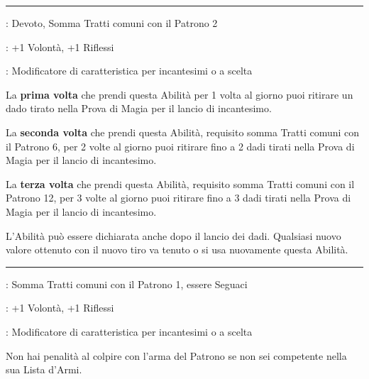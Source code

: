 \begin{multicols}{2}
\smallskip\noindent\rule{\linewidth}{2pt} \hypertarget{Il Patrono è con me}{}\medskip{}
\noindent
\begin{description}[noitemsep, topsep=0pt, parsep=0pt, partopsep=0pt, leftmargin=0cm, labelwidth=2.5cm]
    \item[\textbf{Requisito}]: Devoto, Somma Tratti comuni con il Patrono 2
    \item[\textbf{Tiri Salvezza}]: +1 Volontà, +1 Riflessi
    \item[\textbf{Caratteristica}]: Modificatore di caratteristica per incantesimi o a scelta
\end{description}

La \textbf{prima volta} che prendi questa Abilità per 1 volta al giorno puoi ritirare un dado tirato nella Prova di Magia per il lancio di incantesimo.

La \textbf{seconda volta} che prendi questa Abilità, requisito somma Tratti comuni con il Patrono 6, per 2 volte al giorno puoi ritirare fino a 2 dadi tirati nella Prova di Magia per il lancio di incantesimo.

La \textbf{terza volta} che prendi questa Abilità, requisito somma Tratti comuni con il Patrono 12, per 3 volte al giorno puoi ritirare fino a 3 dadi tirati nella Prova di Magia per il lancio di incantesimo.

L'Abilità può essere dichiarata anche dopo il lancio dei dadi. Qualsiasi nuovo valore ottenuto con il nuovo tiro va tenuto o si usa nuovamente questa Abilità.

\smallskip\noindent\rule{\linewidth}{2pt} \hypertarget{Il Patrono è la mia Arma}{}\medskip{}\label{Il Patrono è la mia Arma}
\noindent
\begin{description}[noitemsep, topsep=0pt, parsep=0pt, partopsep=0pt, leftmargin=0cm, labelwidth=2.5cm]
    \item[\textbf{Requisito}]: Somma Tratti comuni con il Patrono 1, essere Seguaci
    \item[\textbf{Tiri Salvezza}]: +1 Volontà, +1 Riflessi
    \item[\textbf{Caratteristica}]: Modificatore di caratteristica per incantesimi o a scelta
\end{description}

Non hai penalità al colpire con l'arma del Patrono se non sei competente nella sua Lista d'Armi.


\end{multicols}
